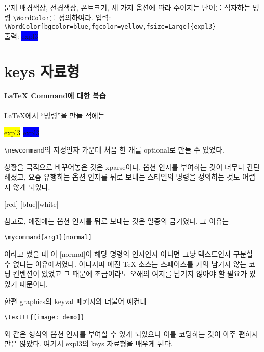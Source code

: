 \documentclass[a4paper,amsmath]{oblivoir}
\begin{document}
\newpage


\begin{questiona}{문제}
배경색상, 전경색상, 폰트크기, 세 가지 옵션에 따라 주어지는 단어를 식자하는 명령
\verb|\WordColor|를 정의하여라.
\tcblower
입력: \verb|\WordColor[bgcolor=blue,fgcolor=yellow,fsize=Large]{expl3}| \\
출력: \colorbox{blue}{\color{yellow}\Large expl3}

\end{questiona}

\section{\textsf{keys} 자료형}

\paragraph{\LaTeX{} Command에 대한 복습}

\LaTeX 에서 “명령”을 만들 적에는 
\begin{exampleside}
\newcommand\foo[3][yellow]{%
    \colorbox{#1}{\color{#2}#3}}
\foo{black}{expl3} \foo[blue]{white}{expl3}
\end{exampleside}
\verb|\newcommand|의 지정인자 가운데 처음 한 개를 optional로 만들 수 있었다.

상황을 극적으로 바꾸어놓은 것은 \textsf{xparse}이다. 옵션 인자를 부여하는 것이
너무나 간단해졌고, 요즘 유행하는 옵션 인자를 뒤로 보내는 스타일의
명령을 정의하는 것도 어렵지 않게 되었다.
\begin{examplebelow}
\NewDocumentCommand{}
 [red] [blue][white]
\end{examplebelow}
참고로, 예전에는 옵션 인자를 뒤로 보내는 것은 일종의 금기였다. 그 이유는
\begin{verbatim}
\mycommand{arg1}[normal]
\end{verbatim}
이라고 썼을 때 이 [normal]이 해당 명령의 인자인지 아니면 그냥 텍스트인지
구분할 수 없다는 이유에서였다. 아다시피 예전 \TeX{} 소스는 스페이스를 거의
남기지 않는 코딩 컨벤션이 있었고 그 때문에 조금이라도 오해의 여지를 남기지
않아야 할 필요가 있었기 때문이다.

한편 \textsf{graphics}의 \textsf{keyval} 패키지와 더불어 예컨대 
\begin{verbatim}
\texttt{[image: demo]}
\end{verbatim}
와 같은 \keyval{} 형식의 옵션 인자를 부여할 수 있게 되었으나
이를 코딩하는 것이 아주 편하지만은 않았다.
여기서 expl3의 \textsf{keys} 자료형을 배우게 된다.
\end{document}

